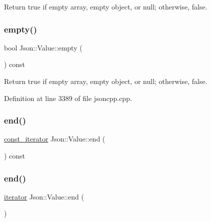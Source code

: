 Return true if empty array, empty object, or null; otherwise, false. 

\hypertarget{class_json_1_1_value_a0519a551e37ee6665d74742b3f96bab3}{}\label{class_json_1_1_value_a0519a551e37ee6665d74742b3f96bab3} 
\subsubsection{\texorpdfstring{empty()}{empty()}\hspace{0.1cm}{\footnotesize\ttfamily [2/2]}}
{\footnotesize\ttfamily bool Json\+::\+Value\+::empty (\begin{DoxyParamCaption}{ }\end{DoxyParamCaption}) const}



Return true if empty array, empty object, or null; otherwise, false. 



Definition at line 3389 of file jsoncpp.\+cpp.

\hypertarget{class_json_1_1_value_a7aa85c7820d0157c0fc8540a727040a7}{}\label{class_json_1_1_value_a7aa85c7820d0157c0fc8540a727040a7} 
\subsubsection{\texorpdfstring{end()}{end()}\hspace{0.1cm}{\footnotesize\ttfamily [1/4]}}
{\footnotesize\ttfamily \hyperlink{class_json_1_1_value_af92282ca92b58b320debd486afb7696a}{const\+\_\+iterator} Json\+::\+Value\+::end (\begin{DoxyParamCaption}{ }\end{DoxyParamCaption}) const}

\hypertarget{class_json_1_1_value_a2ac91976a65644bde515280767c7bcde}{}\label{class_json_1_1_value_a2ac91976a65644bde515280767c7bcde} 
\subsubsection{\texorpdfstring{end()}{end()}\hspace{0.1cm}{\footnotesize\ttfamily [2/4]}}
{\footnotesize\ttfamily \hyperlink{class_json_1_1_value_a341cdf2e01f8b3c5b7317aa2f0768c53}{iterator} Json\+::\+Value\+::end (\begin{DoxyParamCaption}{ }\end{DoxyParamCaption})}

